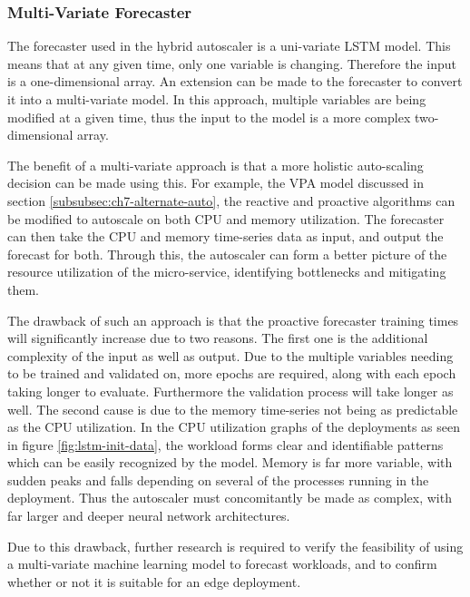 \subsubsection{Multi-Variate Forecaster}
\label{subsubsec:ch7-multi-variate}

The forecaster used in the hybrid autoscaler is a uni-variate LSTM model. This means that at any given time, only one variable is changing. Therefore the input is a one-dimensional array. An extension can be made to the forecaster to convert it into a multi-variate model. In this approach, multiple variables are being modified at a given time, thus the input to the model is a more complex two-dimensional array.\par

The benefit of a multi-variate approach is that a more holistic auto-scaling decision can be made using this. For example, the VPA model discussed in section \ref{subsubsec:ch7-alternate-auto}, the reactive and proactive algorithms can be modified to autoscale on both CPU and memory utilization. The forecaster can then take the CPU and memory time-series data as input, and output the forecast for both. Through this, the autoscaler can form a better picture of the resource utilization of the micro-service, identifying bottlenecks and mitigating them.\par

The drawback of such an approach is that the proactive forecaster training times will significantly increase due to two reasons. The first one is the additional complexity of the input as well as output. Due to the multiple variables needing to be trained and validated on, more epochs are required, along with each epoch taking longer to evaluate. Furthermore the validation process will take longer as well. The second cause is due to the memory time-series not being as predictable as the CPU utilization. In the CPU utilization graphs of the deployments as seen in figure \ref{fig:lstm-init-data}, the workload forms clear and identifiable patterns which can be easily recognized by the model. Memory is far more variable, with sudden peaks and falls depending on several of the processes running in the deployment. Thus the autoscaler must concomitantly be made as complex, with far larger and deeper neural network architectures.\par

Due to this drawback, further research is required to verify the feasibility of using a multi-variate machine learning model to forecast workloads, and to confirm whether or not it is suitable for an edge deployment.

